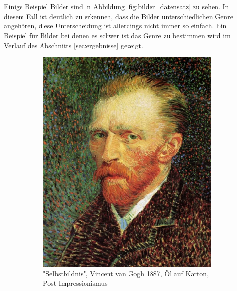 \\\\
Einige Beispiel Bilder sind in Abbildung \ref{fig:bilder_datensatz} zu sehen.
In diesem Fall ist deutlich zu erkennen, dass die Bilder unterschiedlichen Genre angehören, diese Unterscheidung ist allerdings nicht immer so einfach.
Ein Beispiel für Bilder bei denen es schwer ist das Genre zu bestimmen wird im Verlauf des Abschnitts \ref{sec:ergebnisse} gezeigt.
\begin{figure}
    \centering
    \caption{Drei Beispiel Bilder aus drei verschiedenen Genre von bekannten Künstlern.}
    \begin{subfigure}{0.30\textwidth}
        \includegraphics[width=\linewidth]{content/data/Vincent_van_Gogh_582.jpg}
        \caption{"Selbstbildnis", Vincent van Gogh 1887, Öl auf Karton, Post-Impressionismus}
        \label{fig:6}
    \end{subfigure}\hfil %
    \begin{subfigure}{0.30\textwidth}

\end{subfigure}
\end{figure}
